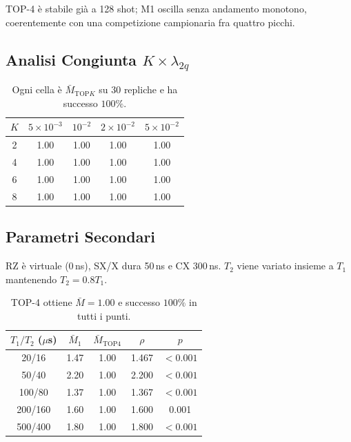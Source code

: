 \begin{onehalfspace}
TOP-4 è stabile già a 128 shot; M1 oscilla senza andamento monotono,
coerentemente con una competizione campionaria fra quattro picchi.

\subsection{Analisi Congiunta
\texorpdfstring{$K\times\lambda_{2q}$}{K x lambda 2q}}
\label{subsec:sweep_joint}

\begin{table}[H]
\centering
\caption[Griglia $K\times\lambda_{2q}$]{Ogni cella è
$\bar M_{\mathrm{TOP}K}$ su 30 repliche e ha successo $100\%$.}
\label{tab:sweep_joint}
\begin{tabular}{ccccc}
\toprule
$K$ & $5\times10^{-3}$ & $10^{-2}$ & $2\times10^{-2}$ & $5\times10^{-2}$ \\
\midrule
2 & 1.00 & 1.00 & 1.00 & 1.00 \\
4 & 1.00 & 1.00 & 1.00 & 1.00 \\
6 & 1.00 & 1.00 & 1.00 & 1.00 \\
8 & 1.00 & 1.00 & 1.00 & 1.00 \\
\bottomrule
\end{tabular}
\end{table}

\subsection{Parametri Secondari}
\label{subsec:sweep_secondari}

RZ è virtuale (0\,ns), SX/X dura 50\,ns e CX 300\,ns. $T_2$ viene
variato insieme a $T_1$ mantenendo $T_2=0.8T_1$.

\begin{table}[H]
\centering
\caption[Sweep di $T_1/T_2$]{TOP-4 ottiene $\bar M=1.00$ e successo
$100\%$ in tutti i punti.}
\label{tab:sweep_t1}
\begin{tabular}{ccccc}
\toprule
$T_1/T_2$ ($\mu$s) & $\bar M_1$ & $\bar M_{\mathrm{TOP4}}$ & $\rho$ & $p$ \\
\midrule
20/16 & 1.47 & 1.00 & 1.467 & $<0.001$ \\
50/40 & 2.20 & 1.00 & 2.200 & $<0.001$ \\
100/80 & 1.37 & 1.00 & 1.367 & $<0.001$ \\
200/160 & 1.60 & 1.00 & 1.600 & 0.001 \\
500/400 & 1.80 & 1.00 & 1.800 & $<0.001$ \\
\bottomrule
\end{tabular}
\end{table}


\end{onehalfspace}
